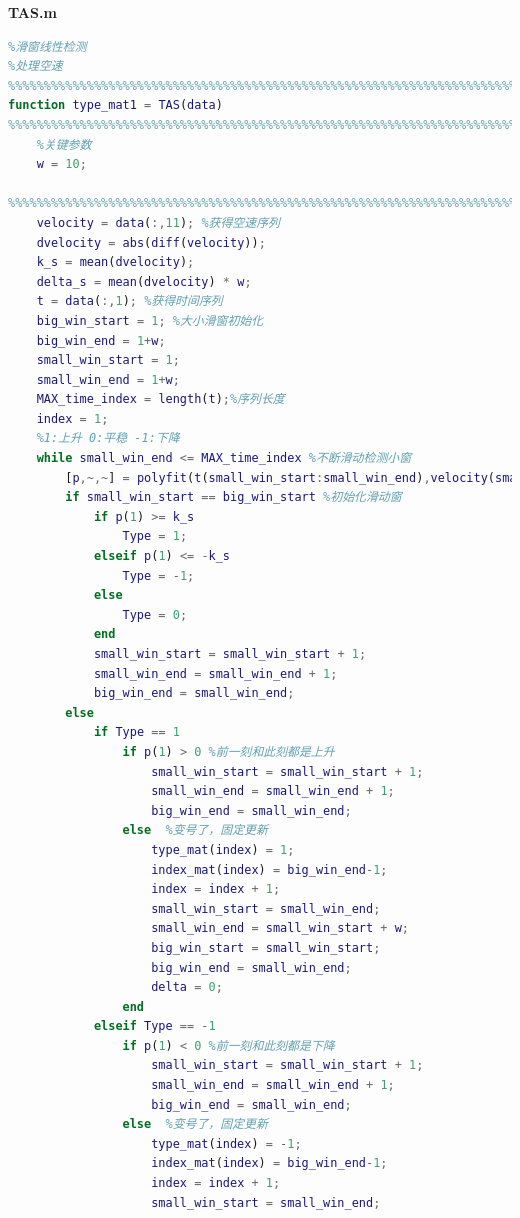 \documentclass{my_paper}
\begin{document}
\textbf{TAS.m}
\begin{lstlisting}[language=matlab]
    %%%%%%%%%%%%%%%%%%%%%%%%%%%%%%%%%%%%%%%%%%%%%%%%%%%%%%%%%%%%%%%%%%%%%%%%%%%
%滑窗线性检测
%处理空速
%%%%%%%%%%%%%%%%%%%%%%%%%%%%%%%%%%%%%%%%%%%%%%%%%%%%%%%%%%%%%%%%%%%%%%%%%%%
function type_mat1 = TAS(data)
%%%%%%%%%%%%%%%%%%%%%%%%%%%%%%%%%%%%%%%%%%%%%%%%%%%%%%%%%%%%%%%%%%%%%%%%%%%
    %关键参数
    w = 10;
    
%%%%%%%%%%%%%%%%%%%%%%%%%%%%%%%%%%%%%%%%%%%%%%%%%%%%%%%%%%%%%%%%%%%%%%%%%%%    
    velocity = data(:,11); %获得空速序列
    dvelocity = abs(diff(velocity));
    k_s = mean(dvelocity);
    delta_s = mean(dvelocity) * w;
    t = data(:,1); %获得时间序列  
    big_win_start = 1; %大小滑窗初始化
    big_win_end = 1+w;
    small_win_start = 1;
    small_win_end = 1+w;
    MAX_time_index = length(t);%序列长度
    index = 1;
    %1:上升 0:平稳 -1:下降 
    while small_win_end <= MAX_time_index %不断滑动检测小窗
        [p,~,~] = polyfit(t(small_win_start:small_win_end),velocity(small_win_start:small_win_end),1); %拟合小窗数据
        if small_win_start == big_win_start %初始化滑动窗
            if p(1) >= k_s
                Type = 1;
            elseif p(1) <= -k_s
                Type = -1;
            else
                Type = 0;
            end
            small_win_start = small_win_start + 1;
            small_win_end = small_win_end + 1;
            big_win_end = small_win_end;
        else
            if Type == 1
                if p(1) > 0 %前一刻和此刻都是上升
                    small_win_start = small_win_start + 1;
                    small_win_end = small_win_end + 1;
                    big_win_end = small_win_end;            
                else  %变号了，固定更新
                    type_mat(index) = 1;
                    index_mat(index) = big_win_end-1;
                    index = index + 1;
                    small_win_start = small_win_end;
                    small_win_end = small_win_start + w;
                    big_win_start = small_win_start;
                    big_win_end = small_win_end;
                    delta = 0;
                end
            elseif Type == -1
                if p(1) < 0 %前一刻和此刻都是下降
                    small_win_start = small_win_start + 1;
                    small_win_end = small_win_end + 1;
                    big_win_end = small_win_end;            
                else  %变号了，固定更新
                    type_mat(index) = -1;
                    index_mat(index) = big_win_end-1;
                    index = index + 1;
                    small_win_start = small_win_end;

\end{lstlisting}
\end{document}
